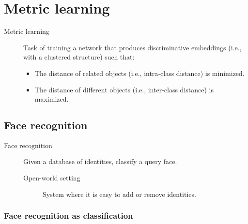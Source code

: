 \chapter{Metric learning}


\begin{description}
    \item[Metric learning] 
        Task of training a network that produces discriminative embeddings (i.e., with a clustered structure) such that:
        \begin{itemize}
            \item The distance of related objects (i.e., intra-class distance) is minimized.
            \item The distance of different objects (i.e., inter-class distance) is maximized.
        \end{itemize}
\end{description}

\section{Face recognition}

\begin{description}
    \item[Face recognition] 
        Given a database of identities, classify a query face.

        \begin{description}
            \item[Open-world setting]
                System where it is easy to add or remove identities.
        \end{description}
\end{description}


\subsection{Face recognition as classification}

